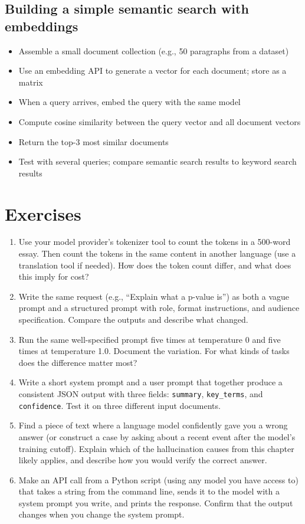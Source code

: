 \subsection{Building a simple semantic search with embeddings}
\begin{itemize}[noitemsep,topsep=0pt]
  \item Assemble a small document collection (e.g., 50 paragraphs from a dataset)
  \item Use an embedding API to generate a vector for each document; store as a matrix
  \item When a query arrives, embed the query with the same model
  \item Compute cosine similarity between the query vector and all document vectors
  \item Return the top-3 most similar documents
  \item Test with several queries; compare semantic search results to keyword search results
\end{itemize}

\section{Exercises}

\begin{enumerate}[noitemsep,topsep=0pt]
  \item Use your model provider's tokenizer tool to count the tokens in a 500-word essay. Then count the tokens in the same content in another language (use a translation tool if needed). How does the token count differ, and what does this imply for cost?
  \item Write the same request (e.g., ``Explain what a p-value is'') as both a vague prompt and a structured prompt with role, format instructions, and audience specification. Compare the outputs and describe what changed.
  \item Run the same well-specified prompt five times at temperature 0 and five times at temperature 1.0. Document the variation. For what kinds of tasks does the difference matter most?
  \item Write a short system prompt and a user prompt that together produce a consistent JSON output with three fields: \texttt{summary}, \texttt{key\_terms}, and \texttt{confidence}. Test it on three different input documents.
  \item Find a piece of text where a language model confidently gave you a wrong answer (or construct a case by asking about a recent event after the model's training cutoff). Explain which of the hallucination causes from this chapter likely applies, and describe how you would verify the correct answer.
  \item Make an API call from a Python script (using any model you have access to) that takes a string from the command line, sends it to the model with a system prompt you write, and prints the response. Confirm that the output changes when you change the system prompt.
\end{enumerate}

